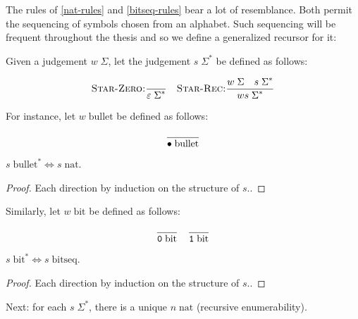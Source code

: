 The rules of \ref{nat-rules} and \ref{bitseq-rules} bear a lot of resemblance.
Both permit the sequencing of symbols chosen from an alphabet. Such sequencing
will be frequent throughout the thesis and so we define a generalized recursor
for it:

\begin{definition}

Given a judgement $w\;\Sigma$, let the judgement $s\;\Sigma^*$ be defined as
follows:

\begin{equation}\label{star-rules}
\sequent[Star-Zero]{}{\varepsilon\;\Sigma^*}
\quad
\sequent[Star-Rec]{
  w\;\Sigma \quad s\;\Sigma^*
}{
  w s\;\Sigma^*}
\end{equation}

\end{definition}

For instance, let $w\;\text{bullet}$ be defined as follows:

\begin{equation}
\sequent{}{\bullet\;\text{bullet}}
\end{equation}

\begin{theorem}
$s\;\text{bullet}^* \Leftrightarrow s\;\text{nat}$.
\end{theorem}

\begin{proof} Each direction by induction on the structure of $s$.. \end{proof}

Similarly, let $w\;\text{bit}$ be defined as follows:

\begin{equation}
\sequent{}{\symb{0}\;\text{bit}}
\quad
\sequent{}{\symb{1}\;\text{bit}}
\end{equation}

\begin{theorem}
$s\;\text{bit}^* \Leftrightarrow s\;\text{bitseq}$.
\end{theorem}

\begin{proof} Each direction by induction on the structure of $s$.. \end{proof}

Next: for each $s\;\Sigma^*$, there is a unique $n\;\text{nat}$ (recursive
enumerability).

\newpage



